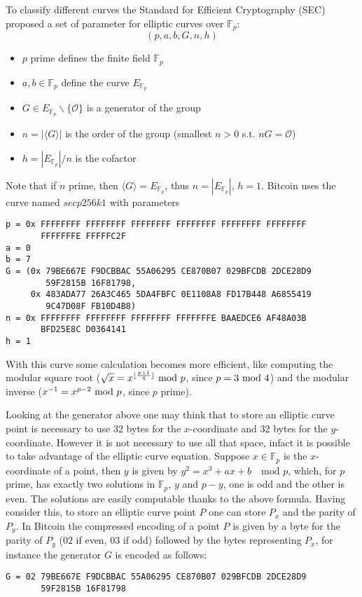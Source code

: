 To classify different curves the Standard for Efficient Cryptography (SEC) proposed a set of parameter for elliptic curves over $\mathbb{F}_p$:
\begin{equation}
(p, a, b, G, n, h)
\end{equation}
\begin{itemize}
	\item $p$ prime defines the finite field $\mathbb{F}_p$
	\item $a, b \in \mathbb{F}_p$ define the curve $E_{\mathbb{F}_p}$
	\item $G\in E_{\mathbb{F}_p}\backslash \{\mathcal{O}\}$ is a generator of the group
	\item $n = |\langle G \rangle|$ is the order of the group (smallest $n>0$ s.t. $nG = \mathcal{O}$)
	\item $h = |E_{\mathbb{F}_p}| / n$ is the cofactor
\end{itemize}
Note that if $n$ prime, then $\langle G \rangle = E_{\mathbb{F}_p}$, thus $n = |E_{\mathbb{F}_p}|$, $h=1$.
Bitcoin uses the curve named $secp256k1$ with parameters
\begin{verbatim}
p = 0x FFFFFFFF FFFFFFFF FFFFFFFF FFFFFFFF FFFFFFFF FFFFFFFF 
       FFFFFFFE FFFFFC2F
a = 0
b = 7
G = (0x 79BE667E F9DCBBAC 55A06295 CE870B07 029BFCDB 2DCE28D9 
        59F2815B 16F81798, 
     0x 483ADA77 26A3C465 5DA4FBFC 0E1108A8 FD17B448 A6855419 
        9C47D08F FB10D4B8)
n = 0x FFFFFFFF FFFFFFFF FFFFFFFF FFFFFFFE BAAEDCE6 AF48A03B 
       BFD25E8C D0364141
h = 1
\end{verbatim}
With this curve some calculation becomes more efficient, like computing the modular square root ($\sqrt{x}=x^{\lfloor\frac{p+1}{4}\rfloor}\textmd{ mod }p$, since $p= 3 \textmd{ mod }4$) and the modular inverse ($x^{-1}=x^{p-2}\textmd{ mod }p$, since $p$ prime).

Looking at the generator above one may think that to store an elliptic curve point is necessary to use 32 bytes for the $x$-coordinate and 32 bytes for the $y$-coordinate. 
However it is not necessary to use all that space, infact it is possible to take advantage of the elliptic curve equation. Suppose $x \in \mathbb{F}_p$ is the $x$-coordinate of a point, then $y$ is given by $y^2 = x^3 + ax + b \quad \text{mod }p$, which, for $p$ prime, has exactly two solutions in $\mathbb{F}_p$, $y$ and $p-y$, one is odd and the other is even.
The solutions are easily computable thanks to the above formula.
Having consider this, to store an elliptic curve point $P$ one can store $P_x$ and the parity of $P_y$. 
In Bitcoin the compressed encoding of a point $P$ is given by a byte for the parity of $P_y$ ($02$ if even, $03$ if odd) followed by the bytes representing $P_x$, for instance the generator $G$ is encoded as follows:
\begin{verbatim}
G = 02 79BE667E F9DCBBAC 55A06295 CE870B07 029BFCDB 2DCE28D9 
       59F2815B 16F81798
\end{verbatim}

